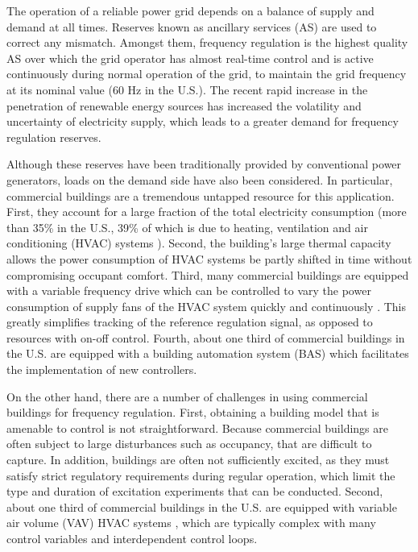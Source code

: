 \documentclass[../thesis.tex]{subfiles}
\begin{document}
The operation of a reliable power grid depends on a balance of supply and demand at all times. 
Reserves known as ancillary services (AS) are used to correct any mismatch.
Amongst them, frequency regulation is the highest quality AS over which the grid operator has almost real-time control and is active continuously during normal operation of the grid, to maintain the grid frequency at its nominal value (60 Hz in the U.S.).
The recent rapid increase in the penetration of renewable energy sources has increased the volatility and uncertainty of electricity supply, which leads to a greater demand for frequency regulation reserves.

Although these reserves have been traditionally provided by conventional power generators, loads on the demand side have also been considered. 
In particular, commercial buildings are a tremendous untapped resource for this application. 
First, they account for a large fraction of the total electricity consumption (more than 35\% in the U.S., 39\% of which is due to heating, ventilation and air conditioning (HVAC) systems \cite{USenergy:2013}). 
Second, the building's large thermal capacity allows the power consumption of HVAC systems be partly shifted in time without compromising occupant comfort. 
Third, many commercial buildings are equipped with a variable frequency drive which can be controlled to vary the power consumption of supply fans of the HVAC system quickly and continuously \cite{Hao:2012demandresponse}. This greatly simplifies tracking of the reference regulation signal, as opposed to resources with on-off control.
Fourth, about one third of commercial buildings in the U.S. are equipped with a building automation system (BAS) \cite{Braun:2012} which facilitates the implementation of new controllers.

On the other hand, there are a number of challenges in using commercial buildings for frequency regulation. 
First, obtaining a building model that is amenable to control is not straightforward. 
Because commercial buildings are often subject to large disturbances such as occupancy, that are difficult to capture. 
In addition, buildings are often not sufficiently excited, as they must satisfy strict regulatory requirements during regular operation, which limit the type and duration of excitation experiments that can be conducted.
Second, about one third of commercial buildings in the U.S. are equipped with variable air volume (VAV) HVAC systems \cite{Hao:2012demandresponse}, which are typically complex with many control variables and interdependent control loops.
\end{document}
